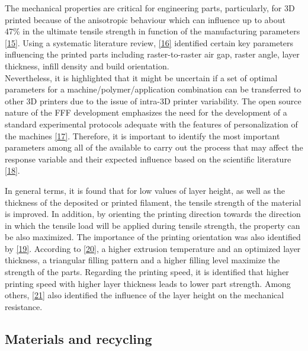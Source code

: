 \documentclass[conference,final,]{IEEEtran}
\begin{document}
The mechanical properties are critical for engineering parts,
particularly, for 3D printed because of the anisotropic behaviour which
can influence up to about 47\% in the ultimate tensile strength in
function of the manufacturing parameters
\protect\hyperlink{ref-Laureto2018}{{[}15{]}}. Using a systematic
literature review, \protect\hyperlink{ref-Popescu2018}{{[}16{]}}
identified certain key parameters influencing the printed parts
including raster-to-raster air gap, raster angle, layer thickness,
infill density and build orientation.\\
Nevertheless, it is highlighted that it might be uncertain if a set of
optimal parameters for a machine/polymer/application combination can be
transferred to other 3D printers due to the issue of intra-3D printer
variability. The open source nature of the FFF development emphasizes
the need for the development of a standard experimental protocols
adequate with the features of personalization of the machines
\protect\hyperlink{ref-CruzSanchez2014}{{[}17{]}}. Therefore, it is
important to identify the most important parameters among all of the
available to carry out the process that may affect the response variable
and their expected influence based on the scientific literature
\protect\hyperlink{ref-JaisinghSheoran2019}{{[}18{]}}.

In general terms, it is found that for low values of layer height, as
well as the thickness of the deposited or printed filament, the tensile
strength of the material is improved. In addition, by orienting the
printing direction towards the direction in which the tensile load will
be applied during tensile strength, the property can be also maximized.
The importance of the printing orientation was also identified by
\protect\hyperlink{ref-Yao2019}{{[}19{]}}. According to
\protect\hyperlink{ref-Alafaghani2018}{{[}20{]}}, a higher extrusion
temperature and an optimized layer thickness, a triangular filling
pattern and a higher filling level maximize the strength of the parts.
Regarding the printing speed, it is identified that higher printing
speed with higher layer thickness leads to lower part strength. Among
others, \protect\hyperlink{ref-Altan2018}{{[}21{]}} also identified the
influence of the layer height on the mechanical resistance.

\hypertarget{materials-and-recycling}{%
\subsection{Materials and recycling}\label{materials-and-recycling}}
\end{document}
